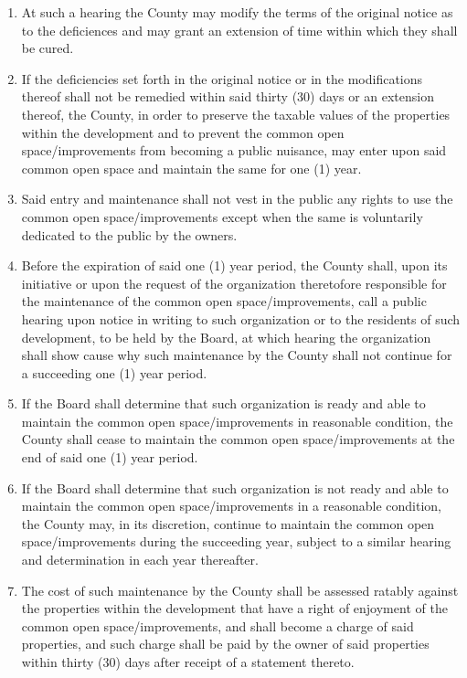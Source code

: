 \documentclass[12pt, letterpaper]{article}
\begin{document}
\begin{enumerate}
\begin{enumerate}
 \item At such a hearing the County may modify the terms of the original notice as to the deficiences and may grant an extension of time within which they shall be cured.
 \item If the deficiencies set forth in the original notice or in the modifications thereof shall not be remedied within said thirty (30) days or an extension thereof, the County, in order to preserve the taxable values of the properties within the development and to prevent the common open space/improvements from becoming a public nuisance, may enter upon said common open space and maintain the same for one (1) year.
 \item Said entry and maintenance shall not vest in the public any rights to use the common open space/improvements except when the same is voluntarily dedicated to the public by the owners.
 \item Before the expiration of said one (1) year period, the County shall, upon its initiative or upon the request of the organization theretofore responsible for the maintenance of the common open space/improvements, call a public hearing upon notice in writing to such organization or to the residents of such development, to be held by the Board, at which hearing the organization shall show cause why such maintenance by the County shall not continue for a succeeding one (1) year period.
 \item If the Board shall determine that such organization is ready and able to maintain the common open space/improvements in reasonable condition, the County shall cease to maintain the common open space/improvements at the end of said one (1) year period.
 \item If the Board shall determine that such organization is not ready and able to maintain the common open space/improvements in a reasonable condition, the County may, in its discretion, continue to maintain the common open space/improvements during the succeeding year, subject to a similar hearing and determination in each year thereafter.
 \item The cost of such maintenance by the County shall be assessed ratably against the properties within the development that have a right of enjoyment of the common open space/improvements, and shall become a charge of said properties, and such charge shall be paid by the owner of said properties within thirty (30) days after receipt of a statement thereto.
 \end{enumerate}
\end{enumerate}
\end{document}
